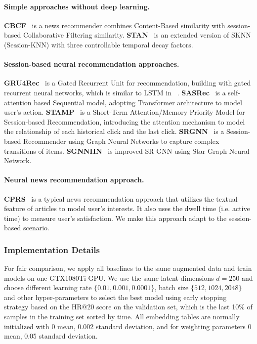 \paragraph{Simple approaches without deep learning.}

\textbf{CBCF}~\cite{sottocornola2018session} is a news recommender combines Content-Based similarity with session-based Collaborative Filtering similarity.
\textbf{STAN}~\cite{garg2019sequence} is an extended version of SKNN (Session-KNN) with three controllable temporal decay factors.

\paragraph{Session-based neural recommendation approaches.}
  \textbf{GRU4Rec}~\cite{hidasi2015session,hidasi2018recurrent} is a Gated Recurrent Unit for recommendation, building with gated recurrent neural networks, which is similar to LSTM in ~\cite{moreira_news_2018}.
  \textbf{SASRec}~\cite{kang_self-attentive_2018} is a self-attention based Sequential model, adopting Transformer architecture to model user's action.
  \textbf{STAMP}~\cite{liu2018stamp} is a Short-Term Attention/Memory Priority Model for Session-based Recommendation, introducing the attention mechanism to model the relationship of each historical click and the last click.
  \textbf{SRGNN}~\cite{wu2019session} is a Session-based Recommender using Graph Neural Networks to capture complex transitions of items.
  \textbf{SGNNHN}~\cite{pan2020star} is improved SR-GNN using Star Graph Neural Network.
\paragraph{Neural news recommendation approach.}
\textbf{CPRS}~\cite{wu2020CPRS} is a typical news recommendation approach that utilizes the textual feature of articles to model user's interests. It also uses the dwell time (i.e. active time) to measure user's satisfaction. We make this approach adapt to the session-based scenario.

\subsubsection{Implementation Details}
For fair comparison, we apply all baselines to the same augmented data and train 
models on one GTX1080Ti GPU.
We use the same latent dimensions $d=250$ and choose different learning rate $\{0.01, 0.001, 0.0001\}$, batch size $\{512, 1024, 2048\}$ and other hyper-parameters to select the best model using early stopping strategy based on the HR@20 score on the validation set, which is the last 10\% of samples in the training set sorted by time. All embedding tables are normally initialized with 0 mean, 0.002 standard deviation, and for weighting parameters 0 mean, 0.05 standard deviation.

